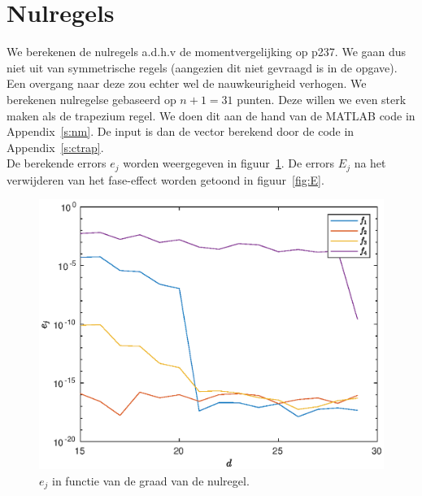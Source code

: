 \documentclass{article}
\begin{document}
\section{Nulregels}
We berekenen de nulregels a.d.h.v de momentvergelijking op p237. We gaan dus niet uit van symmetrische regels (aangezien dit niet gevraagd is in de opgave). Een overgang naar deze zou echter wel de nauwkeurigheid verhogen. We berekenen nulregelse gebaseerd op $n+1 = 31$ punten. Deze willen we even sterk maken als de trapezium regel. We doen dit aan de hand van de MATLAB code in Appendix~\ref{s:nm}. De input is dan de vector berekend door de code in Appendix~\ref{s:ctrap}. \\

De berekende errors $e_j$ worden weergegeven in figuur~\ref{fig:e}. De errors $E_j$ na het verwijderen van het fase-effect worden getoond in figuur~\ref{fig:E}.

\begin{figure}[H]
\centering
\includegraphics[width=\linewidth]{e.eps}
\caption{$e_j$ in functie van de graad van de nulregel.} \label{fig:e}
\end{figure}
\end{document}
